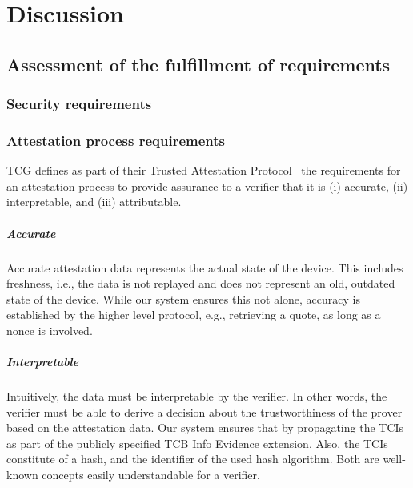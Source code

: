 
\chapter{Discussion}\label{chapter:discussion}

\section{Assessment of the fulfillment of requirements}

\subsection{Security requirements}

\subsection{Attestation process requirements}


\ac{TCG} defines as part of their Trusted Attestation Protocol~\cite{tap} the requirements for an attestation process to provide assurance to a verifier that it is (i) accurate, (ii) interpretable, and (iii) attributable.

\paragraph{Accurate}
Accurate attestation data represents the actual state of the device.
This includes freshness, i.e., the data is not replayed and does not represent an old, outdated state of the device.
While our system ensures this not alone, accuracy is established by the higher level protocol, e.g., retrieving a quote, as long as a nonce is involved.

\paragraph{Interpretable}
Intuitively, the data must be interpretable by the verifier.
In other words, the verifier must be able to derive a decision about the trustworthiness of the prover based on the attestation data.
Our system ensures that by propagating the TCIs as part of the publicly specified TCB Info Evidence extension.
Also, the TCIs constitute of a hash, and the identifier of the used hash algorithm.
Both are well-known concepts easily understandable for a verifier.

